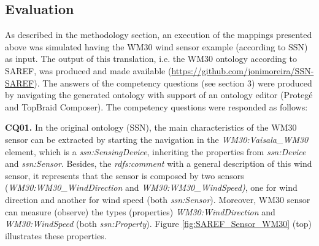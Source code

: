 \documentclass{sig-alternate-05-2015}
\begin{document}
\subsection{Evaluation}
As described in the methodology section, an execution of the mappings presented above was simulated having the WM30 wind sensor example (according to SSN) as input. The output of this translation, i.e. the WM30 ontology according to SAREF, was produced and made available (\url{https://github.com/jonimoreira/SSN-SAREF}). The answers of the competency questions (see section 3) were produced by navigating the generated ontology with support of an ontology editor (Protegé and TopBraid Composer). The competency questions were responded as follows:

\noindent
\textbf{CQ01.} In the original ontology (SSN), the main characteristics of the WM30 sensor can be extracted by starting the navigation in the \textit{WM30:\-Vaisala\-\_WM30} element, which is a \textit{ssn:\-SensingDevice}, inheriting the properties from \textit{ssn:\-Device} and \textit{ssn:\-Sensor}. Besides, the \textit{rdfs:comment} with a general description of this wind sensor, it represents that the sensor is composed by two sensors (\textit{WM30:\-WM30\-\_Wind\-Direction} and \textit{WM30:\-WM30\-\_WindSpeed)}, one for wind direction and another for wind speed (both \textit{ssn:\-Sensor}). Moreover, WM30 sensor can measure (observe) the types (properties) \textit{WM30:\-WindDirection} and \textit{WM30:\-WindSpeed} (both \textit{ssn:\-Property}). Figure \ref{fig:SAREF_Sensor_WM30} (top) illustrates these properties.
\end{document}
